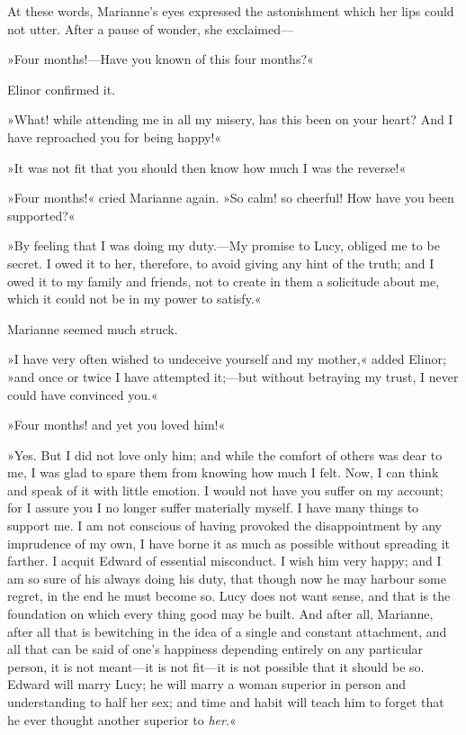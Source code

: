 At these words, Marianne’s eyes expressed the astonishment which her lips could not utter. After a pause of wonder, she exclaimed—

»Four months!—Have you known of this four months?«

Elinor confirmed it.

»What! while attending me in all my misery, has this been on your heart? And I have reproached you for being happy!«

»It was not fit that you should then know how much I was the reverse!«

»Four months!« cried Marianne again. »So calm! so cheerful! How have you been supported?«

»By feeling that I was doing my duty.—My promise to Lucy, obliged me to be secret. I owed it to her, therefore, to avoid giving any hint of the truth; and I owed it to my family and friends, not to create in them a solicitude about me, which it could not be in my power to satisfy.«

Marianne seemed much struck.

»I have very often wished to undeceive yourself and my mother,« added Elinor; »and once or twice I have attempted it;—but without betraying my trust, I never could have convinced you.«

»Four months! and yet you loved him!«

»Yes. But I did not love only him; and while the comfort of others was dear to me, I was glad to spare them from knowing how much I felt. Now, I can think and speak of it with little emotion. I would not have you suffer on my account; for I assure you I no longer suffer materially myself. I have many things to support me. I am not conscious of having provoked the disappointment by any imprudence of my own, I have borne it as much as possible without spreading it farther. I acquit Edward of essential misconduct. I wish him very happy; and I am so sure of his always doing his duty, that though now he may harbour some regret, in the end he must become so. Lucy does not want sense, and that is the foundation on which every thing good may be built. And after all, Marianne, after all that is bewitching in the idea of a single and constant attachment, and all that can be said of one’s happiness depending entirely on any particular person, it is not meant—it is not fit—it is not possible that it should be so. Edward will marry Lucy; he will marry a woman superior in person and understanding to half her sex; and time and habit will teach him to forget that he ever thought another superior to \textit{her}.«


